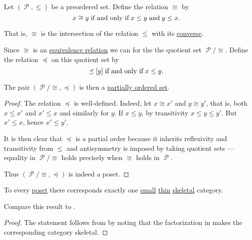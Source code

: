 \begin{proposition}\label{thm:preorder_to_partial_order}
  Let \( (\mscrP, \leq) \) be a preordered set. Define the relation \( \cong \) by
  \begin{equation}\label{eq:thm:preorder_to_partial_order/equivalence}
    x \cong y \T{if and only if} x \leq y \T{and} y \leq x.
  \end{equation}

  That is, \( \cong \) is the intersection of the relation \( \leq \) with its \hyperref[def:binary_relation/converse]{converse}.

  Since \( \cong \) is an \hyperref[def:equivalence_relation]{equivalence relation} we can for the the quotient set \( \mscrP / \cong \). Define the relation \( \preceq \) on this quotient set by
  \begin{equation*}
    [x] \preceq [y] \T{if and only if} x \leq y.
  \end{equation*}

  The pair \( (\mscrP / \cong, \preceq) \) is then a \hyperref[def:poset]{partially ordered set}.
\end{proposition}
\begin{proof}
  The relation \( \preceq \) is well-defined. Indeed, let \( x \cong x' \) and \( y \cong y' \), that is, both \( x \leq x' \) and \( x' \leq x \) and similarly for \( y \). If \( x \leq y \), by transitivity \( x \leq y \leq y' \). But \( x' \leq x \), hence \( x' \leq y' \).

  It is then clear that \( \preceq \) is a partial order because it inherits reflexivity and transitivity from \( \leq \) and antisymmetry is imposed by taking quotient sets --- equality in \( \mscrP / \cong \) holds precisely when \( \cong \) holds in \( \mscrP \).

  Thus \( (\mscrP / \cong, \preceq) \) is indeed a poset.
\end{proof}

\begin{proposition}\label{thm:partial_order_category_correspondence}
  To every \hyperref[def:poset]{poset} there corresponds exactly one \hyperref[def:small_and_large_categories]{small} \hyperref[def:thin_category]{thin} \hyperref[def:skeletal_category]{skeletal} category.

  Compare this result to .
\end{proposition}
\begin{proof}
  The statement follows from  by noting that the factorization in  makes the corresponding category skeletal.
\end{proof}

